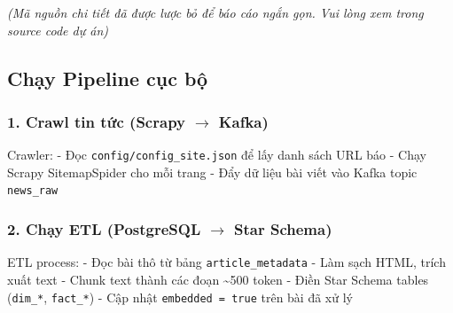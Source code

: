 \emph{(Mã nguồn chi tiết đã được lược bỏ để báo cáo ngắn gọn. Vui lòng
xem trong source code dự án)}

\hypertarget{chux1ea1y-pipeline-cux1ee5c-bux1ed9}{%
\subsection{Chạy Pipeline cục
bộ}}

\hypertarget{crawl-tin-tux1ee9c-scrapy-rightarrow-kafka}{%
\subsubsection{\texorpdfstring{1. Crawl tin tức (Scrapy \(\rightarrow\)
Kafka)}{1. Crawl tin tức (Scrapy \textbackslash rightarrow Kafka)}}}

\begin{Shaded}
\begin{Highlighting}[]

\end{Highlighting}
\end{Shaded}

Crawler: - Đọc \texttt{config/config\_site.json} để lấy danh sách URL
báo - Chạy Scrapy SitemapSpider cho mỗi trang - Đẩy dữ liệu bài viết vào
Kafka topic \texttt{news\_raw}

\hypertarget{chux1ea1y-etl-postgresql-rightarrow-star-schema}{%
\subsubsection{\texorpdfstring{2. Chạy ETL (PostgreSQL \(\rightarrow\)
Star
Schema)}{2. Chạy ETL (PostgreSQL \textbackslash rightarrow Star Schema)}}}

\begin{Shaded}
\begin{Highlighting}[]
\end{Highlighting}
\end{Shaded}

ETL process: - Đọc bài thô từ bảng \texttt{article\_metadata} - Làm sạch
HTML, trích xuất text - Chunk text thành các đoạn \textasciitilde500
token - Điền Star Schema tables (\texttt{dim\_*}, \texttt{fact\_*}) -
Cập nhật \texttt{embedded\ =\ true} trên bài đã xử lý


